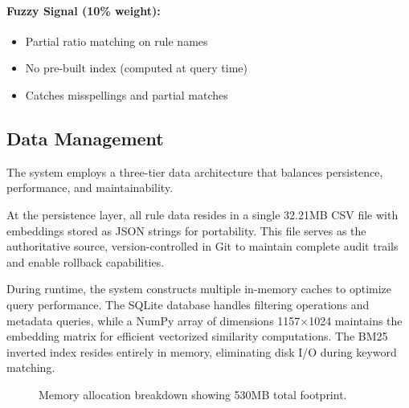 \paragraph{Fuzzy Signal (10\% weight):}
\begin{itemize}[leftmargin=*,itemsep=2pt,topsep=2pt]
  \item Partial ratio matching on rule names
  \item No pre-built index (computed at query time)
  \item Catches misspellings and partial matches
\end{itemize}

\subsection{Data Management}
The system employs a three-tier data architecture that balances persistence, performance, and maintainability. 

At the persistence layer, all rule data resides in a single 32.21MB CSV file with embeddings stored as JSON strings for portability. This file serves as the authoritative source, version-controlled in Git to maintain complete audit trails and enable rollback capabilities.

During runtime, the system constructs multiple in-memory caches to optimize query performance. The SQLite database handles filtering operations and metadata queries, while a NumPy array of dimensions 1157×1024 maintains the embedding matrix for efficient vectorized similarity computations. The BM25 inverted index resides entirely in memory, eliminating disk I/O during keyword matching.


\begin{figure}[H]
\centering
{}
\caption{Memory allocation breakdown showing 530MB total footprint.}
\label{fig:memory-breakdown}
\end{figure}

